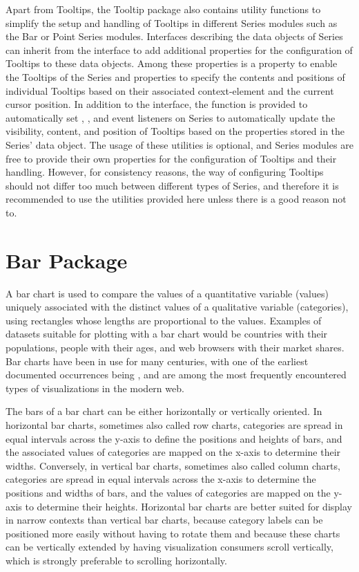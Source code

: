 Apart from Tooltips, the Tooltip package also contains utility
functions to simplify the setup and handling of Tooltips in different
Series modules such as the Bar or Point Series modules. Interfaces
describing the data objects of Series can inherit from the
 interface to add additional properties for
the configuration of Tooltips to these data objects. Among these
properties is a property to enable the Tooltips of the Series and
properties to specify the contents and positions of individual
Tooltips based on their associated context-element and the current
cursor position. In addition to the 
interface, the  function is
provided to automatically set , ,
and  event listeners on Series to automatically
update the visibility, content, and position of Tooltips based on the
 properties stored in the Series' data
object. The usage of these utilities is optional, and Series modules
are free to provide their own properties for the configuration of
Tooltips and their handling. However, for consistency reasons, the way
of configuring Tooltips should not differ too much between different
types of Series, and therefore it is recommended to use the utilities
provided here unless there is a good reason not to.



\section{Bar Package}

A bar chart is used to compare the values of a quantitative variable
(values) uniquely associated with the distinct values of a qualitative
variable (categories), using rectangles whose lengths are
proportional to the values. Examples of datasets suitable for plotting
with a bar chart would be countries with their populations, people
with their ages, and web browsers with their market shares. Bar charts
have been in use for many centuries, with one of the earliest
documented occurrences being \textcite{CommercialAndPoliticalAtlas},
and are among the most frequently encountered types of visualizations
in the modern web.

The bars of a bar chart can be either horizontally or vertically
oriented. In horizontal bar charts, sometimes also called row charts,
categories are spread in equal intervals across the y-axis to define
the positions and heights of bars, and the associated values of
categories are mapped on the x-axis to determine their widths.
Conversely, in vertical bar charts, sometimes also called column
charts, categories are spread in equal intervals across the x-axis to
determine the positions and widths of bars, and the values of
categories are mapped on the y-axis to determine their heights.
Horizontal bar charts are better suited for display in narrow contexts
than vertical bar charts, because category labels can be positioned
more easily without having to rotate them and because these charts can
be vertically extended by having visualization consumers scroll
vertically, which is strongly preferable to scrolling horizontally.


